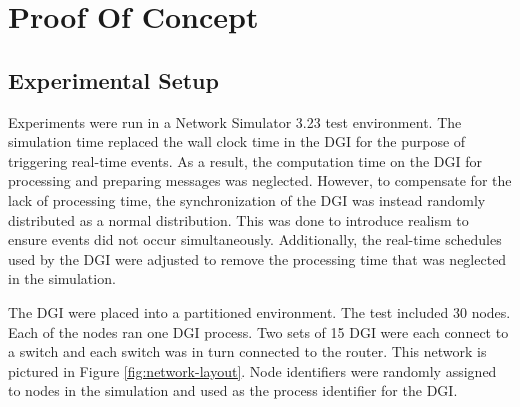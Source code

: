 

\section{Proof Of Concept}

\subsection{Experimental Setup}
\label{sect:experimentalsetup}

Experiments were run in a Network Simulator 3.23\cite{NS3} test environment.
The simulation time replaced the wall clock time in the \ac{DGI} for the purpose of triggering real-time events.
As a result, the computation time on the \ac{DGI} for processing and preparing messages was neglected.
However, to compensate for the lack of processing time, the synchronization of the \ac{DGI} was instead randomly distributed as a normal distribution.
This was done to introduce realism to ensure events did not occur simultaneously.
Additionally, the real-time schedules used by the \ac{DGI} were adjusted to remove the processing time that was neglected in the simulation.

The \ac{DGI} were placed into a partitioned environment.
The test included 30 nodes.
Each of the nodes ran one \ac{DGI} process.
Two sets of 15 \ac{DGI} were each connect to a switch and each switch was in turn connected to the router.
This network is pictured in Figure \ref{fig:network-layout}.
Node identifiers were randomly assigned to nodes in the simulation and used as the process identifier for the \ac{DGI}.

